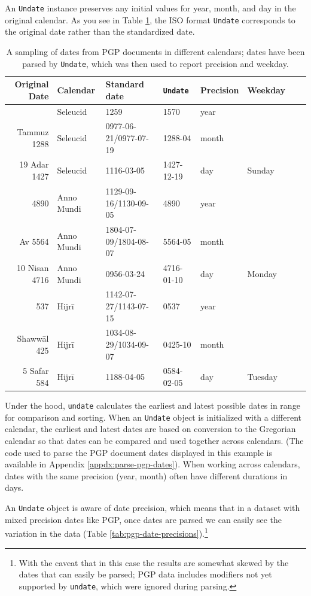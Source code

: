 \documentclass[final]{anthology-ch} %
\begin{document}
An \texttt{Undate} instance preserves any initial values for year, month, and day in the original calendar. As you see in Table \ref{tab:pgp-parsed-dates}, the ISO format \texttt{Undate} corresponds to the original date rather than the standardized date.

\begin{table}[h]
  \centering 
  \begin{tabular}{rlllllll}
    \toprule
Original Date & Calendar & Standard date & \texttt{Undate} & Precision & Weekday \\ 
\midrule\addlinespace[2.5pt]
1570 & Seleucid & 1259 & 1570 & year &  \\
Tammuz 1288 & Seleucid & 0977-06-21/0977-07-19 & 1288-04 & month &  \\
19 Adar 1427 & Seleucid & 1116-03-05 & 1427-12-19 & day & Sunday \\
\midrule
4890 & Anno Mundi & 1129-09-16/1130-09-05 & 4890 & year &  \\
Av 5564 & Anno Mundi & 1804-07-09/1804-08-07 & 5564-05 & month &  \\
10 Nisan 4716 & Anno Mundi & 0956-03-24 & 4716-01-10 & day & Monday \\
\midrule
537 & Hijrī & 1142-07-27/1143-07-15 & 0537 & year &  \\
Shawwāl 425 & Hijrī & 1034-08-29/1034-09-07 & 0425-10 & month &  \\
5 Safar 584 & Hijrī & 1188-04-05 & 0584-02-05 & day & Tuesday \\
\bottomrule
    \bottomrule
  \end{tabular}
  \caption{A sampling of dates from PGP documents in different calendars; dates have been parsed by \texttt{Undate}, which was then used to report precision and weekday.}
  \label{tab:pgp-parsed-dates}
\end{table}

Under the hood, \texttt{undate} calculates the earliest and latest possible dates in range for comparison and sorting. When an \texttt{Undate} object is initialized with a different calendar, the earliest and latest dates are based on conversion to the Gregorian calendar so that dates can be compared and used together across calendars. (The code used to parse the PGP document dates displayed in this example is available in Appendix \ref{appdx:parse-pgp-dates}). When working across calendars, dates with the same precision (year, month) often have different durations in days.

An \texttt{Undate} object is aware of date precision, which means that in a dataset with mixed precision dates like PGP, once dates are parsed we can easily see the variation in the data (Table \ref{tab:pgp-date-precisions}).\footnote{With the caveat that in this case the results are somewhat skewed by the dates that can easily be parsed; PGP data includes modifiers not yet supported by \texttt{undate}, which were ignored during parsing.}
\end{document}
